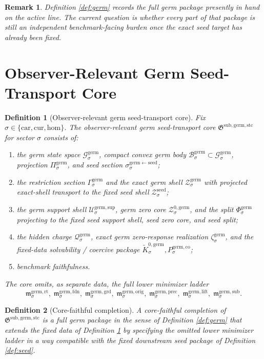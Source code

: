 \documentclass[11pt]{article}
\newcommand{\Car}{\mathrm{car}}
\newcommand{\Cur}{\mathrm{cur}}
\newcommand{\Hom}{\mathrm{hom}}
\newcommand{\SeedShell}[1]{\mathcal Z_{#1}^{\mathrm{seed}}}
\newcommand{\GermTransportCore}{\mathfrak G^{\mathrm{sub,germ,stc}}}
\newcommand{\GermState}[1]{\mathcal G_{#1}^{\mathrm{germ}}}
\newcommand{\GermBody}[1]{\mathcal B_{#1}^{\mathrm{germ}}}
\newcommand{\GermProj}[1]{\Pi_{#1}^{\mathrm{germ}}}
\newcommand{\GermSeedSec}[1]{\sigma_{#1}^{\mathrm{germ\leftarrow seed}}}
\newcommand{\GermShell}[1]{\mathcal Z_{#1}^{\mathrm{germ}}}
\newcommand{\GermSupportShell}[1]{\mathcal U_{#1}^{\mathrm{germ,sup}}}
\newcommand{\GermZeroCore}[1]{\mathcal Z_{#1}^{0,\mathrm{germ}}}
\newcommand{\GermSplit}[1]{\Phi_{#1}^{\mathrm{germ}}}
\newcommand{\GermRootMin}[1]{\mathfrak m_{#1}^{\mathrm{germ,rt}}}
\newcommand{\GermFoundMin}[1]{\mathfrak m_{#1}^{\mathrm{germ,fdn}}}
\newcommand{\GermGroundMin}[1]{\mathfrak m_{#1}^{\mathrm{germ,grd}}}
\newcommand{\GermOrigMin}[1]{\mathfrak m_{#1}^{\mathrm{germ,orig}}}
\newcommand{\GermPrecMin}[1]{\mathfrak m_{#1}^{\mathrm{germ,prec}}}
\newcommand{\GermLiftMin}[1]{\mathfrak m_{#1}^{\mathrm{germ,lift}}}
\newcommand{\GermSubMin}[1]{\mathfrak m_{#1}^{\mathrm{germ,sub}}}
\newcommand{\GermSection}[1]{\Gamma_{#1}^{\mathrm{germ}}}
\newcommand{\GermCharge}[1]{\mathcal Q_{#1}^{\mathrm{germ}}}
\newcommand{\GermEmbed}[1]{\zeta_{#1}^{\mathrm{germ}}}
\newcommand{\GermKernel}[1]{\widetilde K_{#1}^{0,\mathrm{germ}}}
\newcommand{\GermCoercive}[1]{P_{#1}^{\mathrm{germ,co}}}
\newtheorem{definition}{Definition}
\newtheorem{remark}{Remark}
\begin{document}
\begin{remark}
Definition \ref{def:germ} records the full germ package presently in hand on the active line. The current question is whether every part of that package is still an independent benchmark-facing burden once the exact seed target has already been fixed.
\end{remark}

\section{Observer-Relevant Germ Seed-Transport Core}

\begin{definition}[Observer-relevant germ seed-transport core]
\label{def:core}
Fix \(\sigma\in\{\Car,\Cur,\Hom\}\). The \emph{observer-relevant germ seed-transport core} \(\GermTransportCore\) for sector \(\sigma\) consists of:
\begin{enumerate}
    \item the germ state space \(\GermState{\sigma}\), compact convex germ body \(\GermBody{\sigma}\subset\GermState{\sigma}\), projection \(\GermProj{\sigma}\), and seed section \(\GermSeedSec{\sigma}\);
    \item the restriction section \(\GermSection{\sigma}\) and the exact germ shell \(\GermShell{\sigma}\) with projected exact-shell transport to the fixed seed shell \(\SeedShell{\sigma}\);
    \item the germ support shell \(\GermSupportShell{\sigma}\), germ zero core \(\GermZeroCore{\sigma}\), and the split \(\GermSplit{\sigma}\) projecting to the fixed seed support shell, seed zero core, and seed split;
    \item the hidden charge \(\GermCharge{\sigma}\), exact germ zero-response realization \(\GermEmbed{\sigma}\), and the fixed-data solvability / coercive package \(\GermKernel{\sigma},\GermCoercive{\sigma}\);
    \item benchmark faithfulness.
\end{enumerate}
The core omits, as separate data, the full lower minimizer ladder
\[
\GermRootMin{\sigma},\;
\GermFoundMin{\sigma},\;
\GermGroundMin{\sigma},\;
\GermOrigMin{\sigma},\;
\GermPrecMin{\sigma},\;
\GermLiftMin{\sigma},\;
\GermSubMin{\sigma}.
\]
\end{definition}

\begin{definition}[Core-faithful completion]
\label{def:completion}
A \emph{core-faithful completion} of \(\GermTransportCore\) is a full germ package in the sense of Definition \ref{def:germ} that extends the fixed data of Definition \ref{def:core} by specifying the omitted lower minimizer ladder in a way compatible with the fixed downstream seed package of Definition \ref{def:seed}.
\end{definition}
\end{document}
